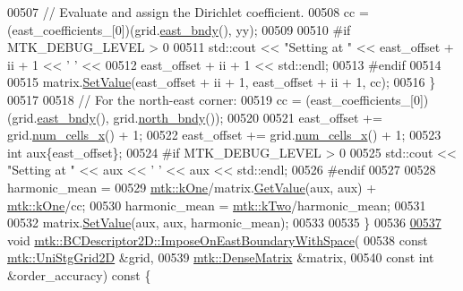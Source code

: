 \begin{DoxyCode}
00507     \textcolor{comment}{// Evaluate and assign the Dirichlet coefficient.}
00508     cc = (east\_coefficients\_[0])(grid.\hyperlink{classmtk_1_1UniStgGrid2D_a03f689eb29a6369b82ce1207c655d5ff}{east\_bndy}(), yy);
00509 
00510 \textcolor{preprocessor}{    #if MTK\_DEBUG\_LEVEL > 0}
00511     std::cout << \textcolor{stringliteral}{"Setting at "} << east\_offset + ii + 1 << \textcolor{charliteral}{' '} <<
00512       east\_offset + ii + 1 << std::endl;
00513 \textcolor{preprocessor}{    #endif}
00514 
00515     matrix.\hyperlink{classmtk_1_1DenseMatrix_a784ce5784109ac86bfb9d8562b334b13}{SetValue}(east\_offset + ii + 1, east\_offset + ii + 1, cc);
00516   \}
00517 
00518   \textcolor{comment}{// For the north-east corner:}
00519   cc = (east\_coefficients\_[0])(grid.\hyperlink{classmtk_1_1UniStgGrid2D_a03f689eb29a6369b82ce1207c655d5ff}{east\_bndy}(), grid.\hyperlink{classmtk_1_1UniStgGrid2D_afe1ead253cdeb5503e0489eba8fd84e2}{north\_bndy}());
00520 
00521   east\_offset += grid.\hyperlink{classmtk_1_1UniStgGrid2D_a2d182866a398aba8e4829590e85bf939}{num\_cells\_x}() + 1;
00522   east\_offset += grid.\hyperlink{classmtk_1_1UniStgGrid2D_a2d182866a398aba8e4829590e85bf939}{num\_cells\_x}() + 1;
00523   \textcolor{keywordtype}{int} aux\{east\_offset\};
00524 \textcolor{preprocessor}{  #if MTK\_DEBUG\_LEVEL > 0}
00525   std::cout << \textcolor{stringliteral}{"Setting at "} << aux << \textcolor{charliteral}{' '} << aux << std::endl;
00526 \textcolor{preprocessor}{  #endif}
00527 
00528   harmonic\_mean =
00529     \hyperlink{group__c01-roots_ga26407c24d43b6b95480943340d285c71}{mtk::kOne}/matrix.\hyperlink{classmtk_1_1DenseMatrix_a4b23ecbebd970b5eea915dbb50691024}{GetValue}(aux, aux) + \hyperlink{group__c01-roots_ga26407c24d43b6b95480943340d285c71}{mtk::kOne}/cc;
00530   harmonic\_mean = \hyperlink{group__c01-roots_gaf39c2d851a2db744f4feb1c5ab3ec2cf}{mtk::kTwo}/harmonic\_mean;
00531 
00532   matrix.\hyperlink{classmtk_1_1DenseMatrix_a784ce5784109ac86bfb9d8562b334b13}{SetValue}(aux, aux, harmonic\_mean);
00533 
00535 \}
00536 
\hypertarget{mtk__bc__descriptor__2d_8cc_source_l00537}{}\hyperlink{classmtk_1_1BCDescriptor2D_a7208d08bfa84192e13c848093eaa88f0}{00537} \textcolor{keywordtype}{void} \hyperlink{classmtk_1_1BCDescriptor2D_a7208d08bfa84192e13c848093eaa88f0}{mtk::BCDescriptor2D::ImposeOnEastBoundaryWithSpace}(
00538     \textcolor{keyword}{const} \hyperlink{classmtk_1_1UniStgGrid2D}{mtk::UniStgGrid2D} &grid,
00539     \hyperlink{classmtk_1_1DenseMatrix}{mtk::DenseMatrix} &matrix,
00540     \textcolor{keyword}{const} \textcolor{keywordtype}{int} &order\_accuracy)\textcolor{keyword}{ const }\{

\end{DoxyCode}
